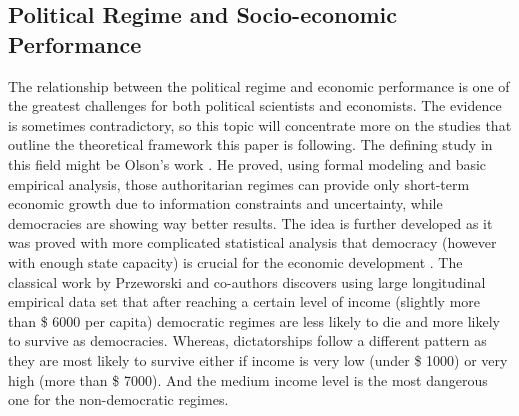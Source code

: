 \documentclass[a4paper, 12pt]{article}
\begin{document}
	\subsection{Political Regime and Socio-economic Performance}
	
	The relationship between the political regime and economic performance is one of the greatest challenges for both political scientists and economists. The evidence is sometimes contradictory, so this topic will concentrate more on the studies that outline the theoretical framework this paper is following. The defining study in this field might be Olson's work \parencite{regime_development}. He proved, using formal modeling and basic empirical analysis, those authoritarian regimes can provide only short-term economic growth due to information constraints and uncertainty, while democracies are showing way better results. The idea is further developed as it was proved with more complicated statistical analysis that democracy (however with enough state capacity) is crucial for the economic development \parencite{regime_development_2}. The classical work by Przeworski and co-authors \parencite{democracy_development} discovers using large longitudinal empirical data set that after reaching a certain level of income (slightly more than \$ 6000 per capita) democratic regimes are less likely to die and more likely to survive as democracies. Whereas, dictatorships follow a different pattern as they are most likely to survive either if income is very low (under \$ 1000) or very high (more than \$ 7000). And the medium income level is the most dangerous one for the non-democratic regimes.
	\\\\
\end{document}

